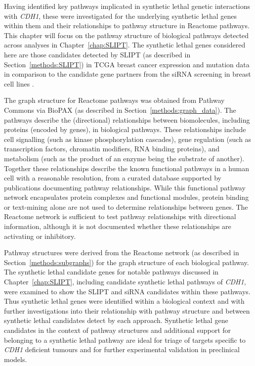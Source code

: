 Having identified key pathways implicated in synthetic lethal genetic interactions with \textit{CDH1}, these were investigated for the underlying synthetic lethal genes within them and their relationships to pathway structure in Reactome pathways. This chapter will focus on the pathway structure of biological pathways detected across analyses in Chapter~\ref{chap:SLIPT}. The synthetic lethal genes considered here are those candidates detected by SLIPT (as described in Section~\ref{methods:SLIPT}) in TCGA breast cancer expression and mutation data \citep{TCGA2012} in comparison to the candidate gene partners from the siRNA screening in breast cell lines \citep{Telford2015}. 

The graph structure for Reactome pathways was obtained from Pathway Commons via \gls{BioPAX} (as described in Section~\ref{methods:graph_data}). The pathways describe the (directional) relationships between biomolecules, including proteins (encoded by genes), in biological pathways. These relationships include cell signalling (such as kinase phosphorylation cascades), gene regulation (such as transcription factors, chromatin modifiers, RNA binding proteins), and metabolism (such as the product of an enzyme being the substrate of another). Together these relationships describe the known functional pathways in a human cell with a reasonable resolution, from a curated database supported by publications documenting pathway relationships.  While this functional pathway network encapsulates protein complexes and functional modules, protein binding or text-mining alone are not used to determine relationships between genes. The Reactome network is sufficient to test pathway relationships with directional information, although it is not documented whether these relationships are activating or inhibitory.

Pathway structures were derived from the Reactome network (as described in Section~\ref{methods:subgraphs}) for the graph structure of each biological pathway. The synthetic lethal candidate genes for notable pathways discussed in Chapter~\ref{chap:SLIPT}, including candidate synthetic lethal pathways of \textit{CDH1}, were examined to show the SLIPT and siRNA candidates within these pathways. Thus synthetic lethal genes were identified within a biological context and with further investigations into their relationship with pathway structure and between synthetic lethal candidates detect by each approach. Synthetic lethal gene candidates in the context of pathway structures and additional support for belonging to a synthetic lethal pathway are ideal for triage of targets specific to \textit{CDH1} deficient tumours and for further experimental validation in preclinical models.

